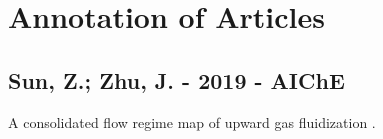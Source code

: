 \chapter{Annotation of Articles}

\section{Sun, Z.; Zhu, J. - 2019 - AIChE}
A consolidated flow regime map of upward gas fluidization 
\citep{sun2019consolidated}. 
